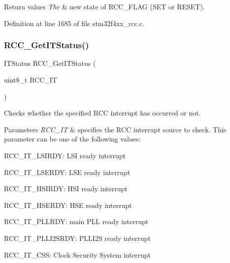 \begin{DoxyRetVals}{Return values}
{\em The} & new state of R\+C\+C\+\_\+\+F\+L\+AG (S\+ET or R\+E\+S\+ET). \\
\hline
\end{DoxyRetVals}


Definition at line 1685 of file stm32f4xx\+\_\+rcc.\+c.

\mbox{\label{group___r_c_c_ga6126c99f398ee4be410ad76ae3aee18f}} 
\subsubsection{\texorpdfstring{R\+C\+C\+\_\+\+Get\+I\+T\+Status()}{RCC\_GetITStatus()}}
{\footnotesize\ttfamily I\+T\+Status R\+C\+C\+\_\+\+Get\+I\+T\+Status (\begin{DoxyParamCaption}\item[{uint8\+\_\+t}]{R\+C\+C\+\_\+\+IT }\end{DoxyParamCaption})}



Checks whether the specified R\+CC interrupt has occurred or not. 


\begin{DoxyParams}{Parameters}
{\em R\+C\+C\+\_\+\+IT} & specifies the R\+CC interrupt source to check. This parameter can be one of the following values\+: \begin{DoxyItemize}
\item R\+C\+C\+\_\+\+I\+T\+\_\+\+L\+S\+I\+R\+DY\+: L\+SI ready interrupt \item R\+C\+C\+\_\+\+I\+T\+\_\+\+L\+S\+E\+R\+DY\+: L\+SE ready interrupt \item R\+C\+C\+\_\+\+I\+T\+\_\+\+H\+S\+I\+R\+DY\+: H\+SI ready interrupt \item R\+C\+C\+\_\+\+I\+T\+\_\+\+H\+S\+E\+R\+DY\+: H\+SE ready interrupt \item R\+C\+C\+\_\+\+I\+T\+\_\+\+P\+L\+L\+R\+DY\+: main P\+LL ready interrupt \item R\+C\+C\+\_\+\+I\+T\+\_\+\+P\+L\+L\+I2\+S\+R\+DY\+: P\+L\+L\+I2S ready interrupt \item R\+C\+C\+\_\+\+I\+T\+\_\+\+C\+SS\+: Clock Security System interrupt \end{DoxyItemize}
\\
\hline
\end{DoxyParams}

